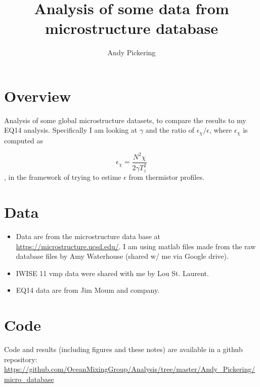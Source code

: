\documentclass[11pt]{article}
\title{Analysis of some data from microstructure database}
\author{Andy Pickering}
\begin{document}
\maketitle

\tableofcontents
\newpage



\section{Overview}

Analysis of some global microstructure datasets, to compare the results to my EQ14 analysis. Specifically I am looking at $\gamma$ and the ratio of $\epsilon_{\chi}/\epsilon$, where $\epsilon_{\chi}$ is computed as 

\begin{equation}
\epsilon_{\chi} = \frac{N^2\chi}{2\gamma T_{z}^{2}}
\end{equation}
, in the framework of trying to estime $\epsilon$ from thermistor profiles.





\section{Data}

\begin{itemize}

\item Data are from the microstructure data base at \url{https://microstructure.ucsd.edu/}. I am using matlab files made from the raw database files by Amy Waterhouse (shared w/ me via Google drive). 

\item IWISE 11 vmp data were shared with me by Lou St. Laurent.

\item EQ14 data are from Jim Moum and company.

\end{itemize}



\section{Code}

Code and results (including figures and these notes) are available in a github repository: \url{https://github.com/OceanMixingGroup/Analysis/tree/master/Andy_Pickering/micro_database}
\end{document}
